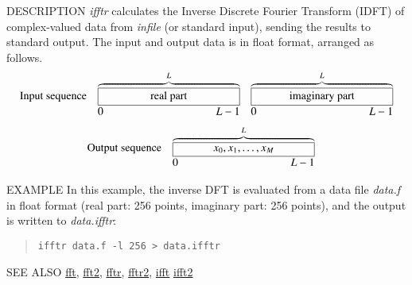 \begin{synopsis}
 \item[ifftr] [ --l $L$ ] [ --m $M$ ] [ {\em infile} ]
\end{synopsis}

\begin{qsection}{DESCRIPTION}
{\em ifftr} calculates the Inverse Discrete Fourier Transform (IDFT)
of complex-valued data from {\em infile} (or standard input),
sending the results to standard output.
The input and output data is in float format, arranged as follows.
\begin{displaymath}
\begin{array}{lll}
\mbox{Input sequence} & \overbrace{\framebox[4.5cm]{real part}}^{L} &
           \overbrace{\framebox[4.5cm]{imaginary part}}^{L} \\
                & \makebox[4.5cm]{0\hfill $L-1$} &
                \makebox[4.5cm]{0\hfill $L-1$}
\end{array}
\end{displaymath}
\begin{displaymath}
\begin{array}{lll}
\mbox{Output sequence} & 
\overbrace{\framebox[4.5cm]{$x_0, x_1, \ldots, x_{M}$}}^{L}  & \\
                & \makebox[4.5cm]{0\hfill $L-1$} &
\end{array}
\end{displaymath}
\end{qsection}

\begin{options}
\end{options}

\begin{qsection}{EXAMPLE}
In this example, the inverse DFT is evaluated from a data file
{\em data.f} in float format
(real part: 256 points, imaginary part: 256 points),
and the output is written to {\em data.ifftr}:
\begin{quote}
  \verb!ifftr data.f -l 256 > data.ifftr!
\end{quote}
\end{qsection}

\begin{qsection}{SEE ALSO}
\hyperlink{fft}{fft},
\hyperlink{fft2}{fft2},
\hyperlink{fftr}{fftr},
\hyperlink{fftr2}{fftr2},
\hyperlink{ifft}{ifft}
\hyperlink{ifft2}{ifft2}
\end{qsection}
